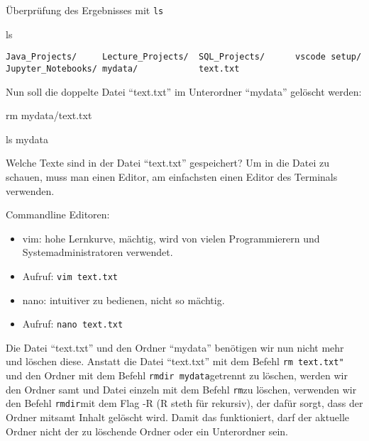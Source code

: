 \documentclass[
  11pt,
  a4paper,
  DIV=11,
  numbers=noendperiod]{scrartcl}
\newenvironment{Shaded}{\begin{snugshade}}{\end{snugshade}}
\newcommand{\NormalTok}[1]{\textcolor[rgb]{0.00,0.23,0.31}{#1}}
\newcommand{\OperatorTok}[1]{\textcolor[rgb]{0.37,0.37,0.37}{#1}}
\providecommand{\tightlist}{%
  \setlength{\itemsep}{0pt}\setlength{\parskip}{0pt}}\usepackage{longtable,booktabs,array}
\begin{document}
Überprüfung des Ergebnisses mit \texttt{ls}

\begin{Shaded}
\begin{Highlighting}[numbers=left,,]
\NormalTok{ls}
\end{Highlighting}
\end{Shaded}

\begin{verbatim}
Java_Projects/     Lecture_Projects/  SQL_Projects/      vscode setup/
Jupyter_Notebooks/ mydata/            text.txt
\end{verbatim}

Nun soll die doppelte Datei ``text.txt'' im Unterordner ``mydata''
gelöscht werden:

\begin{Shaded}
\begin{Highlighting}[numbers=left,,]
\NormalTok{rm mydata}\OperatorTok{/}\NormalTok{text.txt}
\end{Highlighting}
\end{Shaded}

\begin{Shaded}
\begin{Highlighting}[numbers=left,,]
\NormalTok{ls mydata}
\end{Highlighting}
\end{Shaded}

Welche Texte sind in der Datei ``text.txt'' gespeichert? Um in die Datei
zu schauen, muss man einen Editor, am einfachsten einen Editor des
Terminals verwenden.

Commandline Editoren:

\begin{itemize}
\tightlist
\item
  vim: hohe Lernkurve, mächtig, wird von vielen Programmierern und
  Systemadministratoren verwendet.
\item
  Aufruf: \texttt{vim\ text.txt}
\item
  nano: intuitiver zu bedienen, nicht so mächtig.
\item
  Aufruf: \texttt{nano\ text.txt}
\end{itemize}

Die Datei ``text.txt'' und den Ordner ``mydata'' benötigen wir nun nicht
mehr und löschen diese. Anstatt die Datei ``text.txt'' mit dem Befehl
\texttt{rm\ text.txt"} und den Ordner mit dem Befehl
\texttt{rmdir\ mydata}getrennt zu löschen, werden wir den Ordner samt
und Datei einzeln mit dem Befehl \texttt{rm}zu löschen, verwenden wir
den Befehl \texttt{rmdir}mit dem Flag -R (R steth für rekursiv), der
dafür sorgt, dass der Ordner mitsamt Inhalt gelöscht wird. Damit das
funktioniert, darf der aktuelle Ordner nicht der zu löschende Ordner
oder ein Unterordner sein.
\end{document}
